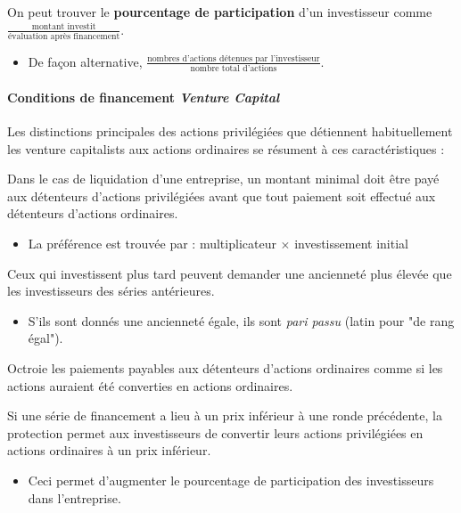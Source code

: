 \documentclass[10pt, french]{article}
\begin{document}
\begin{multicols*}{2}
On peut trouver le \textbf{pourcentage de participation} d'un investisseur comme $\frac{\text{montant investit}}{\text{évaluation après financement}}$.
\begin{itemize}
	\item	De façon alternative, $\frac{\text{nombres d'actions détenues par l'investisseur}}{\text{nombre total d'actions}}$.
\end{itemize}


\paragraph{Conditions de financement \og \textit{Venture Capital} \fg{}}
Les distinctions principales des actions privilégiées que détiennent habituellement les \og venture capitalists \fg{} aux actions ordinaires se résument à ces caractéristiques :

\begin{definitionNOHFILLpropos}
Dans le cas de liquidation d'une entreprise, un montant minimal doit être payé aux détenteurs d'actions privilégiées avant que tout paiement soit effectué aux détenteurs d'actions ordinaires.
\begin{itemize}
	\item	La préférence est trouvée par : multiplicateur $\times$ investissement initial
\end{itemize}
\end{definitionNOHFILLpropos}

\begin{definitionNOHFILLpropos}[Ancienneté]
Ceux qui investissent plus tard peuvent demander une ancienneté plus élevée que les investisseurs des séries antérieures.
\begin{itemize}
	\item	S'ils sont donnés une ancienneté égale, ils sont \textit{pari passu} (latin pour "de rang égal").
\end{itemize}
\end{definitionNOHFILLpropos}

\begin{definitionNOHFILLpropos}
Octroie les paiements payables aux détenteurs d'actions ordinaires comme si les actions auraient été converties en actions ordinaires.
\end{definitionNOHFILLpropos}

\begin{definitionNOHFILLpropos}
Si une série de financement a lieu à un prix inférieur à une ronde précédente, la protection permet aux investisseurs de convertir leurs actions privilégiées en actions ordinaires à un prix inférieur.
\begin{itemize}
	\item	Ceci permet d'augmenter le pourcentage de participation des investisseurs dans l'entreprise.
\end{itemize}
\end{definitionNOHFILLpropos}


\end{multicols*}
\end{document}

